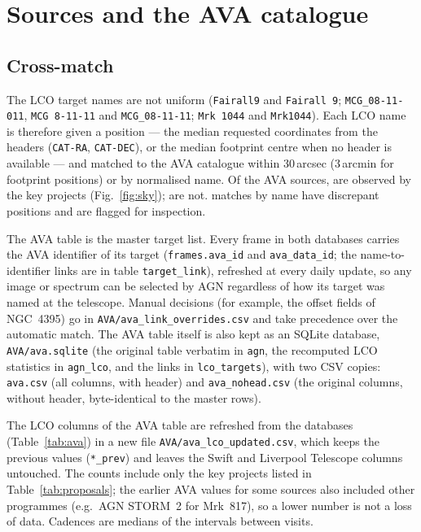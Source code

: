 \chapter{Sources and the AVA catalogue}\label{sec:sources}
\section{Cross-match}
The LCO target names are not uniform (\texttt{Fairall9} and \texttt{Fairall 9}; \texttt{MCG\_08-11-011},
\texttt{MCG 8-11-11} and \texttt{MCG\_08-11-11}; \texttt{Mrk 1044} and \texttt{Mrk1044}). Each LCO name is
therefore given a position --- the median requested coordinates from the headers (\texttt{CAT-RA},
\texttt{CAT-DEC}), or the median footprint centre when no header is available --- and matched to the AVA
catalogue within 30\,arcsec (3\,arcmin for footprint positions) or by normalised name. Of the \nAva{} AVA
sources, \nAvaMatched{} are observed by the key projects (Fig.~\ref{fig:sky}); \avaMissing{} are not. \nAvaReview{}
matches by name have discrepant positions and are flagged for inspection.

The AVA table is the master target list. Every frame in both databases carries the AVA identifier of its target
(\texttt{frames.ava\_id} and \texttt{ava\_data\_id}; the name-to-identifier links are in table
\texttt{target\_link}), refreshed at every daily update, so any image or spectrum can be selected by AGN regardless
of how its target was named at the telescope. Manual decisions (for example, the offset fields of NGC~4395) go in
\texttt{AVA/ava\_link\_overrides.csv} and take precedence over the automatic match. The AVA table itself is also
kept as an SQLite database, \texttt{AVA/ava.sqlite} (the original table verbatim in \texttt{agn}, the recomputed LCO
statistics in \texttt{agn\_lco}, and the links in \texttt{lco\_targets}), with two CSV copies: \texttt{ava.csv}
(all columns, with header) and \texttt{ava\_nohead.csv} (the original columns, without header, byte-identical to
the master rows).

The LCO columns of the AVA table are refreshed from the databases (Table~\ref{tab:ava}) in a new file
\texttt{AVA/ava\_lco\_updated.csv}, which keeps the previous values (\texttt{*\_prev}) and leaves the Swift and
Liverpool Telescope columns untouched. The counts include only the key projects listed in
Table~\ref{tab:proposals}; the earlier AVA values for some sources also included other programmes (e.g.\ AGN
STORM~2 for Mrk~817), so a lower number is not a loss of data. Cadences are medians of the intervals between visits.

